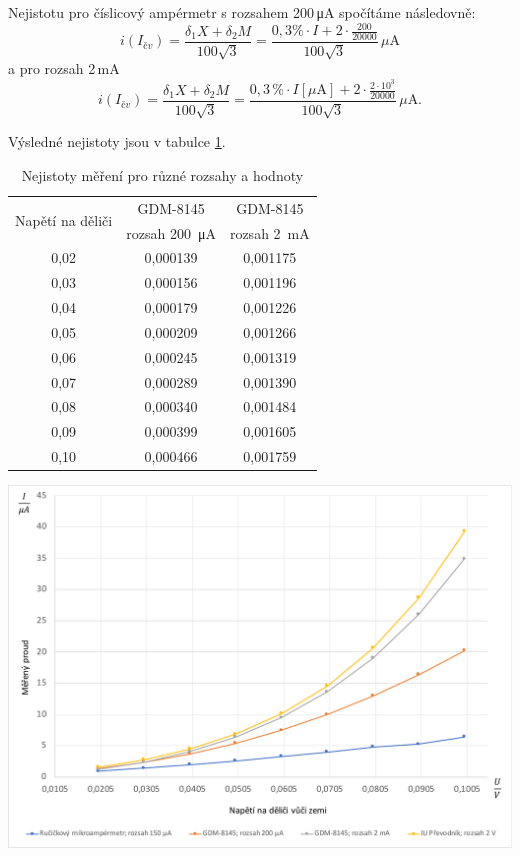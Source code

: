 \documentclass[a4paper,12pt]{article}   %
\newcommand{\tmu}{$\mu$}
\begin{document}
Nejistotu pro číslicový ampérmetr s rozsahem 200\,μA spočítáme následovně:
\begin{equation}
    i(I_{čv}) = \frac{\delta_1 X + \delta_2 M}{100\sqrt{3}} = \frac{0,3\%\cdot I+2\cdot\frac{200}{20000}}{100\sqrt{3}}\,\mu \textrm{A}
\end{equation}
a pro rozsah 2\,mA
\begin{equation}
    i(I_{čv}) = \frac{\delta_1 X + \delta_2 M}{100\sqrt{3}} = \frac{0,3\,\%\cdot I[\mu \textrm{A}]+2\cdot\frac{2\cdot 10^3}{20000}}{100\sqrt{3}}\, \mu \textrm{A.}
\end{equation}

Výsledné nejistoty jsou v tabulce \ref{tab:nejistoty}.
\begin{table}
    \centering
    \begin{tabular}{|c|c|c|}
        \hline
        \multirow{2}{*}{Napětí na děliči}& GDM-8145 	&GDM-8145 \\[.7ex]
        & rozsah 200~μA & rozsah  2~mA \\\hline\hline
        0,02&0,000139&0,001175\\\hline
        0,03&0,000156&0,001196\\\hline
        0,04&0,000179&0,001226\\\hline
        0,05&0,000209&0,001266\\\hline
        0,06&0,000245&0,001319\\\hline
        0,07&0,000289&0,001390\\\hline
        0,08&0,000340&0,001484\\\hline
        0,09&0,000399&0,001605\\\hline
        0,10&0,000466&0,001759\\\hline
    \end{tabular}
    \caption{Nejistoty měření pro různé rozsahy a hodnoty}
    \label{tab:nejistoty}
\end{table}

\begin{graf}[h!]
    \centering
    \includegraphics[width=.8\textwidth]{graf_namereno.pdf}
    \caption{Naměřené hodnoty přepočtené na \tmu A}
    \label{graf:hodnoty}
\end{graf}
\end{document}
